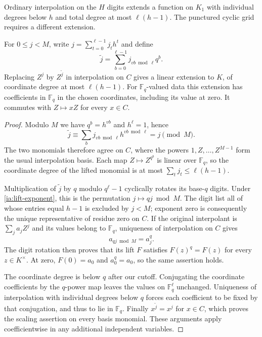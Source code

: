 Ordinary interpolation on the $H$ digits extends a function on $K_1$
with individual degrees below $h$ and total degree at most
$\ell(h-1)$.  The punctured cyclic grid requires a different extension.

\begin{lemma}\label{ia:cyclic-lift}
For $0\le j<M$, write $j=\sum_{t=0}^{\ell-1}j_t h^t$ and define
\begin{equation}
 \widetilde j=\sum_{b=0}^{\ell-1}j_{vb\bmod\ell}q^b.
                                                               \label{ia:lift-exponent}
\end{equation}
Replacing $Z^j$ by $Z^{\widetilde j}$ in interpolation on $C$ gives a
linear extension to $K$, of coordinate degree at most $\ell(h-1)$.
For $\mathbb F_q$-valued data this extension has coefficients in
$\mathbb F_q$ in the chosen coordinates, including its value at zero.
It commutes with $Z\mapsto xZ$ for every $x\in C$.
\end{lemma}

\begin{proof}
Modulo $M$ we have $q^b=h^{vb}$ and $h^\ell=1$, hence
\[
 \widetilde j\equiv
 \sum_b j_{vb\bmod\ell}h^{vb\bmod\ell}=j\pmod M.
\]
The two monomials therefore agree on $C$, where the powers
$1,Z,\ldots,Z^{M-1}$ form the usual interpolation basis.  Each map
$Z\mapsto Z^{q^b}$ is linear over $\mathbb F_q$, so the coordinate
degree of the lifted monomial is at most $\sum_t j_t\le\ell(h-1)$.

Multiplication of $\widetilde j$ by $q$ modulo $q^\ell-1$ cyclically
rotates its base-$q$ digits.  Under \eqref{ia:lift-exponent}, this is
the permutation $j\mapsto qj\bmod M$.  The digit list all of whose
entries equal $h-1$ is excluded by $j<M$; exponent zero is consequently
the unique representative of residue zero on $C$.  If the original
interpolant is $\sum_j a_jZ^j$ and its values belong to $\mathbb F_q$,
uniqueness of interpolation on $C$ gives
\[
 a_{qj\bmod M}=a_j^q.
\]
The digit rotation then proves that its lift $F$ satisfies
$F(z)^q=F(z)$ for every $z\in K^\times$.  At zero, $F(0)=a_0$ and
$a_0^q=a_0$, so the same assertion holds.

The coordinate degree is below $q$ after our cutoff.  Conjugating the
coordinate coefficients by the $q$-power map leaves the values on
$\mathbb F_q^\ell$ unchanged.  Uniqueness of interpolation with
individual degrees below $q$ forces each coefficient to be fixed by
that conjugation, and thus to lie in $\mathbb F_q$.  Finally
$x^{\widetilde j}=x^j$ for $x\in C$, which proves the scaling assertion
on every basis monomial.  These arguments apply coefficientwise in any
additional independent variables.
\end{proof}

